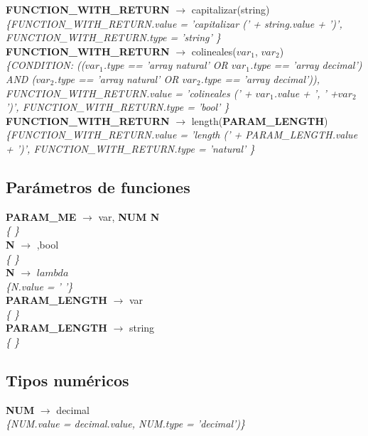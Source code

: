 \documentclass[10pt,a4paper]{article}
\begin{document}
\textbf{FUNCTION\_WITH\_RETURN} $\rightarrow$ capitalizar(string)   \\
\textit{\{FUNCTION\_WITH\_RETURN.value =  'capitalizar (' + string.value + ')', FUNCTION\_WITH\_RETURN.type = 'string' \}} \\

\textbf{FUNCTION\_WITH\_RETURN} $\rightarrow$ colineales($var_{1}$, $var_{2}$)   \\
\textit{\{CONDITION: (($var_{1}$.type == 'array natural' OR $ var_{1}$.type == 'array decimal') AND
($var_{2}$.type == 'array natural' OR $var_{2}$.type == 'array decimal')), FUNCTION\_WITH\_RETURN.value =  'colineales (' + $var_{1}$.value + ', ' +$var_{2}$')', FUNCTION\_WITH\_RETURN.type = 'bool' \}} \\

\textbf{FUNCTION\_WITH\_RETURN} $\rightarrow$ length(\textbf{PARAM\_LENGTH}) \\
\textit{\{FUNCTION\_WITH\_RETURN.value =  'length (' + PARAM\_LENGTH.value + ')', FUNCTION\_WITH\_RETURN.type = 'natural' \}} \\

\subsection{Parámetros de funciones}
\textbf{PARAM\_ME} $\rightarrow$ var, \textbf{NUM N} \\
\textit{\{   \}} \\

\textbf{N} $\rightarrow$ ,bool \\
\textit{\{   \}} \\ 

\textbf{N} $\rightarrow$ $lambda$  \\
\textit{\{N.value = ' '\}} \\

\textbf{PARAM\_LENGTH} $\rightarrow$ var \\
\textit{\{   \}} \\

\textbf{PARAM\_LENGTH} $\rightarrow$ string \\
\textit{\{   \}} \\

\subsection{Tipos numéricos}
\textbf{NUM} $\rightarrow$ decimal \\
\textit{\{NUM.value = decimal.value, NUM.type = 'decimal')\}}  \\ 
\end{document}
